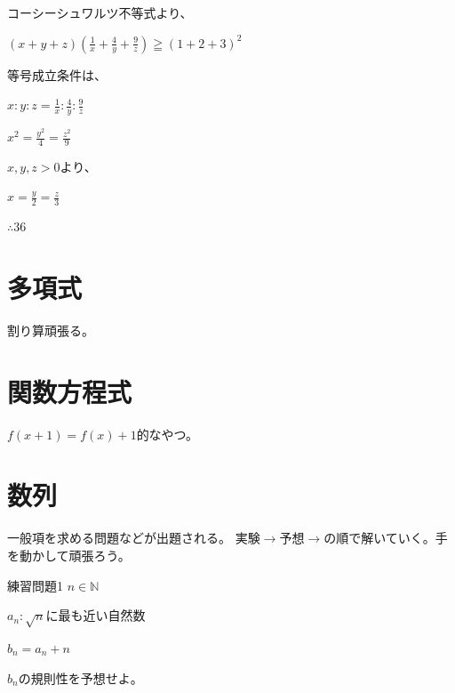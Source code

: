 \documentclass[uplatex,fleqn]{jsbook}
\begin{document}
\begin{answer}
    コーシーシュワルツ不等式より、

    $\displaystyle \left(x+y+z\right)\left(\frac{1}{x}+\frac{4}{y}+\frac{9}{z}\right)\geqq \left(1+2+3\right)^2$

    等号成立条件は、

    $\displaystyle x:y:z=\frac{1}{x}:\frac{4}{y}:\frac{9}{z}$

    $x^2=\frac{y^2}{4}=\frac{z^2}{9}$

    $x,y,z>0$より、

    $x=\frac{y}{2}=\frac{z}{3}$

    $\therefore 36$
\end{answer}

\section{多項式}
割り算頑張る。

\section{関数方程式}
$f\left(x+1\right)=f\left(x\right)+1$的なやつ。

\section{数列}
一般項を求める問題などが出題される。
実験$\rightarrow$予想$\rightarrow$の順で解いていく。手を動かして頑張ろう。

\begin{problem}{練習問題1}
    $n\in \mathbb{N}$

    $a_n:\sqrt{n}$に最も近い自然数

    $b_n=a_n+n$

    $b_n$の規則性を予想せよ。
\end{problem}
\end{document}
